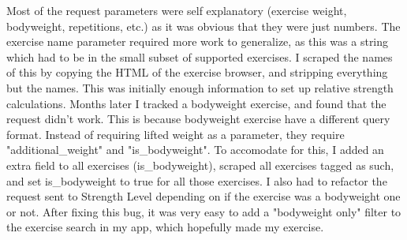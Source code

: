 \documentclass{l4proj}
\begin{document}
Most of the request parameters were self explanatory (exercise weight, bodyweight, repetitions, etc.) as it was obvious that they were just numbers. The exercise name parameter required more work to generalize, as this was a string which had to be in the small subset of supported exercises. I scraped the names of this by copying the HTML of the exercise browser, and stripping everything but the names. This was initially enough information to set up relative strength calculations. Months later I tracked a bodyweight exercise, and found that the request didn't work. This is because bodyweight exercise have a different query format. Instead of requiring lifted weight as a parameter, they require "additional\_weight" and "is\_bodyweight". To accomodate for this, I added an extra field to all exercises (is\_bodyweight), scraped all exercises tagged as such, and set is\_bodyweight to true for all those exercises. I also had to refactor the request sent to Strength Level depending on if the exercise was a bodyweight one or not. After fixing this bug, it was very easy to add a "bodyweight only" filter to the exercise search in my app, which hopefully made my exercise. 
\end{document}
